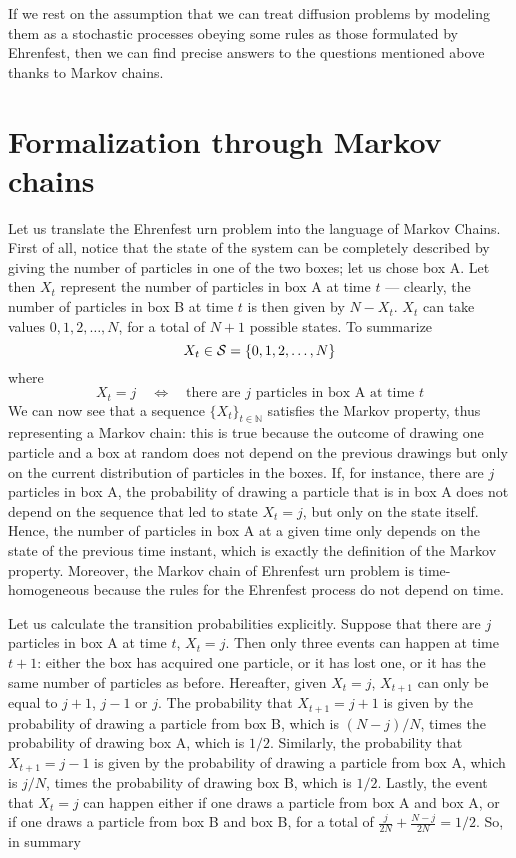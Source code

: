 If we rest on the assumption that we can treat diffusion problems by modeling them as a stochastic processes obeying some rules as those formulated by Ehrenfest, then we can find precise answers to the questions mentioned above thanks to Markov chains.

\section{Formalization through Markov chains}
Let us translate the Ehrenfest urn problem into the language of Markov Chains. 
First of all, notice that the state of the system can be completely described by giving the number of particles in one of the two boxes; let us chose box A. Let then $X_t$ represent the number of particles in box A at time $t$ --- clearly, the number of particles in box B at time $t$ is then given by $N - X_t$. $X_t$ can take values $0, 1, 2, \dots, N$, for a total of $N + 1$ possible states. To summarize
\begin{equation}
    X_t \in \mathcal{S} = \{ 0, 1, 2, \dots, N \}
\end{equation}
where
\begin{equation}
    X_t = j \quad \Leftrightarrow \quad \text{there are $j$ particles in box A at time $t$}
\end{equation}
We can now see that a sequence $\{X_t\}_{t\in \mathbb{N}}$ satisfies the Markov property, thus representing a Markov chain: this is true because the outcome of drawing one particle and a box at random does not depend on the previous drawings but only on the current distribution of particles in the boxes. If, for instance, there are $j$ particles in box A, the probability of drawing a particle that is in box A does not depend on the sequence that led to state $X_t = j$, but only on the state itself. Hence, the number of particles in box A at a given time only depends on the state of the previous time instant, which is exactly the definition of the Markov property. Moreover, the Markov chain of Ehrenfest urn problem is time-homogeneous because the rules for the Ehrenfest process do not depend on time.

Let us calculate the transition probabilities explicitly. Suppose that there are $j$ particles in box A at time $t$, \ie $X_t = j$. Then only three events can happen at time $t+1$: either the box has acquired one particle, or it has lost one, or it has the same number of particles as before. Hereafter, given $X_t = j$, $X_{t+1}$ can only be equal to $j+1$, $j-1$ or $j$. The probability that $X_{t+1} = j+1$ is given by the probability of drawing a particle from box B, which is $(N-j)/N$, times the probability of drawing box A, which is $1/2$. Similarly, the probability that $X_{t+1} = j - 1$ is given by the probability of drawing a particle from box A, which is $j/N$, times the probability of drawing box B, which is $1/2$. Lastly, the event that $X_t = j$ can happen either if one draws a particle from box A and box A, or if one draws a particle from box B and box B, for a total of $\frac{j}{2N} + \frac{N-j}{2N} = 1/2$. So, in summary

